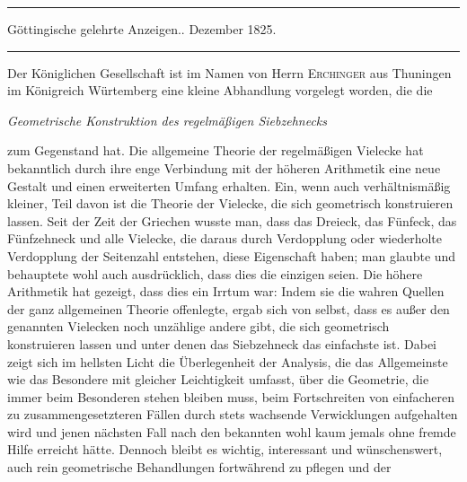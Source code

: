 \begin{center}
\rule{.86\linewidth}{.3pt}\par
Göttingische gelehrte Anzeigen.. Dezember 1825.\par
\rule{.86\linewidth}{.3pt}
\end{center}
Der Königlichen Gesellschaft ist im Namen von Herrn \textsc{Erchinger} aus Thuningen im Königreich Würtemberg eine kleine Abhandlung vorgelegt worden, die die
\begin{center}\emph{Geometrische Konstruktion des regelmäßigen Siebzehnecks}\end{center}
zum Gegenstand hat. Die allgemeine Theorie der regelmäßigen Vielecke hat bekanntlich durch ihre enge Verbindung mit der höheren Arithmetik eine neue Gestalt und einen erweiterten Umfang erhalten. Ein, wenn auch verhältnismäßig kleiner, Teil davon ist die Theorie der Vielecke, die sich geometrisch konstruieren lassen. Seit der Zeit der Griechen wusste man, dass das Dreieck, das Fünfeck, das Fünfzehneck und alle Vielecke, die daraus durch Verdopplung oder wiederholte Verdopplung der Seitenzahl entstehen, diese Eigenschaft haben; man glaubte und behauptete wohl auch ausdrücklich, dass dies die einzigen seien. Die höhere Arithmetik hat gezeigt, dass dies ein Irrtum war: Indem sie die wahren Quellen der ganz allgemeinen Theorie offenlegte, ergab sich von selbst, dass es außer den genannten Vielecken noch unzählige andere gibt, die sich geometrisch konstruieren lassen und unter denen das Siebzehneck das einfachste ist. Dabei zeigt sich im hellsten Licht die Überlegenheit der Analysis, die das Allgemeinste wie das Besondere mit gleicher Leichtigkeit umfasst, über die Geometrie, die immer beim Besonderen stehen bleiben muss, beim Fortschreiten von einfacheren zu zusammengesetzteren Fällen durch stets wachsende Verwicklungen aufgehalten wird und jenen nächsten Fall nach den bekannten wohl kaum jemals ohne fremde Hilfe erreicht hätte. Dennoch bleibt es wichtig, interessant und wünschenswert, auch rein geometrische Behandlungen fortwährend zu pflegen und der

